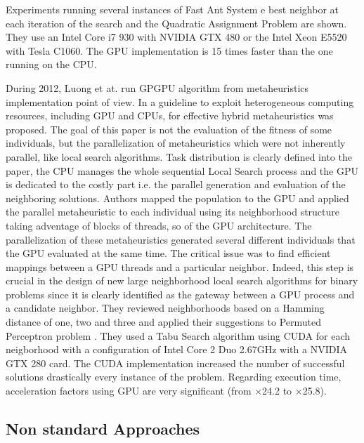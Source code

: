 \documentclass[prodmode,acmtecs]{acmsmall}
\begin{document}
Experiments running several instances of Fast Ant System \cite{Taillard:1998:FFA:870509}e best neighbor at each iteration of the search and the Quadratic Assignment Problem \cite{Zhu:2010:0020-7543:1035} are shown. They use an Intel Core i7 930 with NVIDIA GTX 480 or the Intel Xeon E5520 with Tesla C1060. The GPU implementation is 15 times faster than the one running on the CPU.


During 2012, Luong et at. run GPGPU algorithm from metaheuristics implementation point of view. In \cite{luongMetaheuristicsPpsn2012} a guideline to exploit heterogeneous computing resources, including GPU and CPUs, for effective hybrid metaheuristics was proposed. The goal of this paper is not the evaluation of the fitness of some individuals, but the parallelization of metaheuristics which were not inherently parallel, like local search algorithms. Task distribution is clearly defined into the paper,  the CPU manages the whole sequential Local Search process and the GPU is dedicated to the costly part i.e. the parallel generation and evaluation of the neighboring solutions.
Authors mapped the population to the GPU and applied the parallel metaheuristic to each individual using its neighborhood structure taking adventage of blocks of threads, so of the GPU architecture. The parallelization of these metaheuristics generated several different individuals that the GPU evaluated at the same time. The critical issue was to find efficient mappings between a GPU threads and a particular neighbor. Indeed, this step is crucial in the design of new large neighborhood local search algorithms for binary problems since it is clearly identified as the gateway between a GPU process and a candidate neighbor. They reviewed neighborhoods based on a Hamming distance of one, two and three and applied their suggestions to Permuted Perceptron problem \cite{KnudsenPermutedPerceptronProblem1999}. They used a Tabu Search algorithm \cite{TaillardTabySearch1991} using CUDA for each neigborhood with a configuration of Intel Core 2 Duo 2.67GHz with a NVIDIA GTX 280 card. The CUDA implementation increased the number of successful solutions drastically every instance of the problem. Regarding execution time, acceleration factors using GPU are very significant (from ×24.2 to ×25.8). 

   




\subsection{Non standard Approaches}
\end{document}
